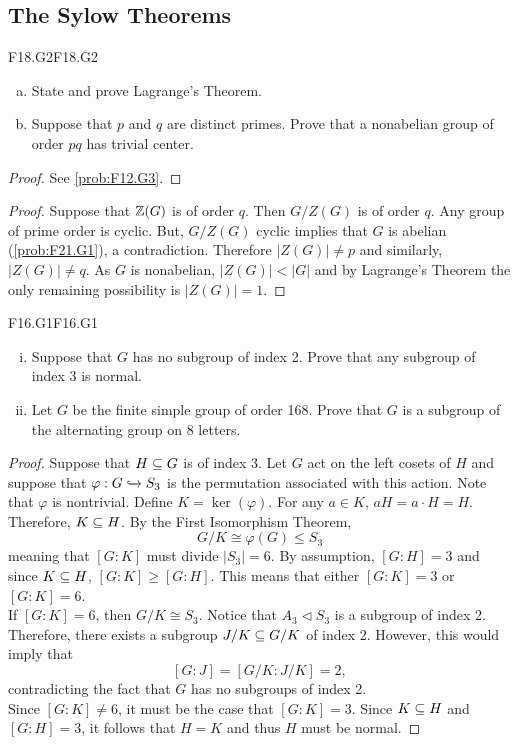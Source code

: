 \documentclass[../AlgebraQualSolutions.tex]{subfiles}
\begin{document}
\subsection{The Sylow Theorems}
	\begin{prob}{F18.G2}{F18.G2}
		\begin{enumerate}[(a)]
			\item State and prove Lagrange's Theorem.
			\item Suppose that $p$ and $q$ are distinct primes. Prove that a nonabelian group of order $pq$ has trivial center.
		\end{enumerate}
	\end{prob}

	\begin{proof}
		See \ref{prob:F12.G3}.
	\end{proof}

	\begin{proof}
		Suppose that $\mathbb{Z}(G)$ is of order $q$. Then $G/Z(G)$ is of order $q$. Any group of prime order is cyclic. But, $G/Z(G)$ cyclic implies that $G$ is abelian (\ref{prob:F21.G1}), a contradiction. Therefore $|Z(G)| \neq p$ and similarly, $|Z(G)| \neq q$. As $G$ is nonabelian, $|Z(G)| < |G|$ and by Lagrange's Theorem the only remaining possibility is $|Z(G)| =1$.
	\end{proof}


	\begin{prob}{F16.G1}{F16.G1}
		\begin{enumerate}[(i)]
			\item Suppose that $G$ has no subgroup of index 2. Prove that any subgroup of index 3 is normal.
			\item Let $G$ be the finite simple group of order 168. Prove that $G$ is a subgroup of the alternating group on 8 letters.
		\end{enumerate}
	\end{prob}

	\begin{proof}
		Suppose that $H \subseteq G$ is of index 3. Let $G$ act on the left cosets of $H$ and suppose that $\varphi: G \xhookrightarrow{} S_3$ is the permutation associated with this action. Note that $\varphi$ is nontrivial. Define $K = \ker(\varphi)$. For any $a \in K$, $aH = a \cdot H = H$. Therefore, $K \subseteq H$. By the First Isomorphism Theorem,
			\[G/K \cong \varphi(G) \leq S_3 \]
		meaning that $[G:K]$ must divide $|S_3| = 6$. By assumption, $[G:H] = 3$ and since $K \subseteq H$, $[G:K] \geq [G:H]$. This means that either $[G:K] = 3$ or $[G:K] = 6$.\\

		If $[G:K] = 6$, then $G/K \cong S_3$. Notice that $A_3 \triangleleft S_3$ is a subgroup of index 2. Therefore, there exists a subgroup $J/K \subseteq G/K$ of index 2. However, this would imply that
			\[[G:J] = [G/K: J/K] = 2,\]
		contradicting the fact that $G$ has no subgroups of index 2.\\

		Since $[G:K] \neq 6$, it must be the case that $[G:K] = 3$. Since $K \subseteq H$ and $[G:H] = 3$, it follows that $H = K$ and thus $H$ must be normal.
	\end{proof}
\end{document}
